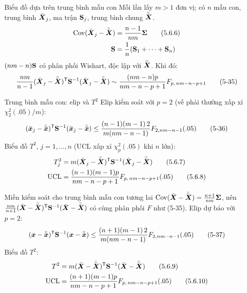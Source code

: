 \begin{frame}{Biểu đồ dựa trên trung bình mẫu con}
  Mỗi lần lấy \(m>1\) đơn vị; có \(n\) mẫu con, trung bình \(\bar{\boldsymbol{X}}_j\), ma trận \(\mathbf{S}_j\), trung bình chung \(\bar{\bar{\boldsymbol{X}}}\).
  \begin{align*}
    \operatorname{Cov}(\bar{\boldsymbol{X}}_j-\bar{\bar{\boldsymbol{X}}})&=\frac{n-1}{nm}\boldsymbol{\Sigma}\tag{5.6.6}\\
    \mathbf{S}&=\frac1n(\mathbf{S}_1+\cdots+\mathbf{S}_n)
  \end{align*}
  \((nm-n)\mathbf{S}\) có phân phối Wishart, độc lập với \(\bar{\bar{\boldsymbol{X}}}\). Khi đó:
  \begin{equation*}
    \frac{nm}{n-1}(\bar{\boldsymbol{X}}_j-\bar{\bar{\boldsymbol{X}}})^{\mathsf T}\mathbf{S}^{-1}(\bar{\boldsymbol{X}}_j-\bar{\bar{\boldsymbol{X}}})
    \sim\frac{(nm-n)p}{nm-n-p+1}F_{p,\,nm-n-p+1}
    \tag{5-35}
  \end{equation*}
\end{frame}

\begin{frame}{Trung bình mẫu con: elip và \(T^2\)}
  Elip kiểm soát với \(p=2\) (vế phải thường xấp xỉ \(\chi^2_2(.05)/m\)):
  \begin{equation}
    (\bar{\boldsymbol{x}}_j-\bar{\bar{\boldsymbol{x}}})^{\mathsf T}\mathbf{S}^{-1}(\bar{\boldsymbol{x}}_j-\bar{\bar{\boldsymbol{x}}})\le\frac{(n-1)(m-1)\,2}{m(nm-n-1)}F_{2,nm-n-1}(.05)
    \tag{5-36}
  \end{equation}
  Biểu đồ \(T^2\), \(j=1,\dots,n\) (UCL xấp xỉ \(\chi^2_p(.05)\) khi \(n\) lớn):
  \begin{align*}
    T_j^2&=m(\bar{\boldsymbol{X}}_j-\bar{\bar{\boldsymbol{X}}})^{\mathsf T}\mathbf{S}^{-1}(\bar{\boldsymbol{X}}_j-\bar{\bar{\boldsymbol{X}}})\tag{5.6.7}\\
    \mathrm{UCL}&=\frac{(n-1)(m-1)p}{nm-n-p+1}F_{p,\,nm-n-p+1}(.05)\tag{5.6.8}
  \end{align*}
\end{frame}

\begin{frame}{Miền kiểm soát cho trung bình mẫu con tương lai}
  \small \(\operatorname{Cov}(\bar{\boldsymbol{X}}-\bar{\bar{\boldsymbol{X}}})=\frac{n+1}{nm}\boldsymbol{\Sigma}\), nên \(\frac{nm}{n+1}(\bar{\boldsymbol{X}}-\bar{\bar{\boldsymbol{X}}})^{\mathsf T}\mathbf{S}^{-1}(\bar{\boldsymbol{X}}-\bar{\bar{\boldsymbol{X}}})\) có cùng phân phối \(F\) như (5-35). Elip dự báo với \(p=2\):
  \begin{equation*}
    (\boldsymbol{x}-\bar{\bar{\boldsymbol{x}}})^{\mathsf T}\mathbf{S}^{-1}(\boldsymbol{x}-\bar{\bar{\boldsymbol{x}}})\le\frac{(n+1)(m-1)\,2}{m(nm-n-1)}F_{2,nm-n-1}(.05)
    \tag{5-37}
  \end{equation*}
  Biểu đồ \(T^2\):
  \begin{align*}
    T^2&=m(\bar{\boldsymbol{X}}-\bar{\bar{\boldsymbol{X}}})^{\mathsf T}\mathbf{S}^{-1}(\bar{\boldsymbol{X}}-\bar{\bar{\boldsymbol{X}}})\tag{5.6.9}\\
    \mathrm{UCL}&=\frac{(n+1)(m-1)p}{nm-n-p+1}F_{p,\,nm-n-p+1}(.05)\tag{5.6.10}
  \end{align*}
  
\end{frame}
\renewcommand{\theequation}{\arabic{equation}}
